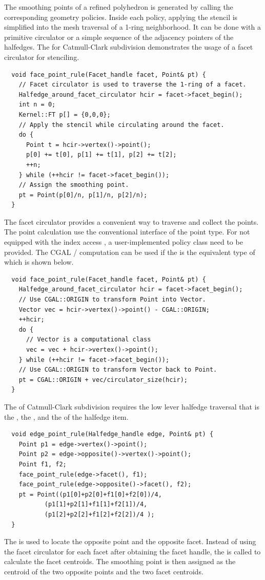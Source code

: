 The smoothing points of a refined polyhedron is generated by calling
the corresponding geometry policies.  Inside each policy, applying the
stencil is simplified into the mesh traversal of a 1-ring
neighborhood. It can be done with a primitive circulator or a simple
sequence of the adjacency pointers of the halfedges. The
 for Catmull-Clark subdivision demonstrates
the usage of a facet circulator for stenciling.
\begin{lstlisting}
  void face_point_rule(Facet_handle facet, Point& pt) {
    // Facet circulator is used to traverse the 1-ring of a facet.
    Halfedge_around_facet_circulator hcir = facet->facet_begin();
    int n = 0;
    Kernel::FT p[] = {0,0,0};
    // Apply the stencil while circulating around the facet. 
    do {
      Point t = hcir->vertex()->point();
      p[0] += t[0], p[1] += t[1], p[2] += t[2]; 
      ++n;
    } while (++hcir != facet->facet_begin());
    // Assign the smoothing point.
    pt = Point(p[0]/n, p[1]/n, p[2]/n);
  }
\end{lstlisting}
The facet circulator provides a convenient way to
traverse and collect the points. The point calculation use
the conventional interface \CodeFmt{[i]} of the point type. 
For  not equipped with the index access 
\CodeFmt{[i]}, a user-implemented policy class need to be 
provided. The CGAL /
computation can be used if the  is the equivalent
type of  which is shown below. 
\begin{lstlisting}
  void face_point_rule(Facet_handle facet, Point& pt) {
    Halfedge_around_facet_circulator hcir = facet->facet_begin();
    // Use CGAL::ORIGIN to transform Point into Vector.
    Vector vec = hcir->vertex()->point() - CGAL::ORIGIN;
    ++hcir;
    do {
      // Vector is a computational class
      vec = vec + hcir->vertex()->point();
    } while (++hcir != facet->facet_begin());
    // Use CGAL::ORIGIN to transform Vector back to Point.
    pt = CGAL::ORIGIN + vec/circulator_size(hcir);
  }
\end{lstlisting}

The  of
Catmull-Clark subdivision requires the low lever 
halfedge traversal that is the ,
the , and the 
of the halfedge item.
\begin{lstlisting}
  void edge_point_rule(Halfedge_handle edge, Point& pt) {
    Point p1 = edge->vertex()->point();
    Point p2 = edge->opposite()->vertex()->point();
    Point f1, f2;
    face_point_rule(edge->facet(), f1);
    face_point_rule(edge->opposite()->facet(), f2);
    pt = Point((p1[0]+p2[0]+f1[0]+f2[0])/4,
	       (p1[1]+p2[1]+f1[1]+f2[1])/4,
	       (p1[2]+p2[2]+f1[2]+f2[2])/4 );
  }
\end{lstlisting}
The  is used to locate the opposite point
and the opposite facet. Instead of using the facet circulator for each
facet after obtaining the facet handle, the
 is called to calculate the facet
centroids. The smoothing point is then assigned as the centroid of the
two opposite points and the two facet centroids.


